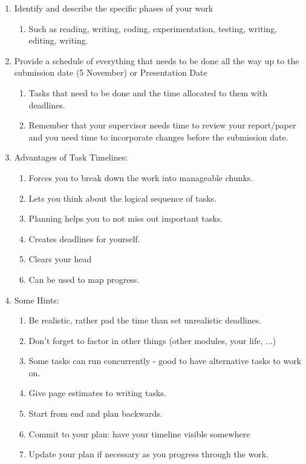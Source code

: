 \documentclass[runningheads,a4paper]{llncs}
\begin{document}
\begin{enumerate}

 \item Identify and describe the specific phases of your work
 \begin{enumerate}
  \item Such as reading, writing, coding, experimentation, testing, writing, editing, writing.
 \end{enumerate}
 
 \item Provide a schedule of everything that needs to be done all the way up to the submission date (5 November) or Presentation Date
 \begin{enumerate}
  \item Tasks that need to be done and the time allocated to them with deadlines.
  \item Remember that your supervisor needs time to review your report/paper and you need time to incorporate changes before the submission date.
 \end{enumerate}
 
 \item Advantages of Task Timelines:
 \begin{enumerate}
  \item Forces you to break down the work into manageable chunks.
  \item Lets you think about the logical sequence of tasks.
  \item Planning helps you to not miss out important tasks.
  \item Creates deadlines for yourself.
  \item Clears your head
  \item Can be used to map progress.
 \end{enumerate}
 
 \item Some Hints:
 \begin{enumerate}
  \item Be realistic, rather pad the time than set unrealistic deadlines.
  \item Don't forget to factor in other things (other modules, your life, ...)
  \item Some tasks can run concurrently - good to have alternative tasks to work on.
  \item Give page estimates to writing tasks.
  \item Start from end and plan backwards.
  \item Commit to your plan: have your timeline visible somewhere
  \item Update your plan if necessary as you progress through the work.
 \end{enumerate}

\end{enumerate}



\end{document}
